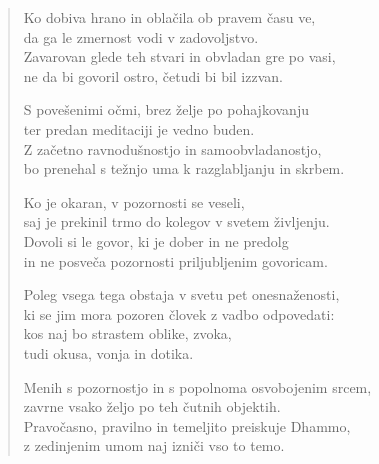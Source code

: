 \begin{verse}
Ko dobiva hrano in oblačila ob pravem času ve,\\
da ga le zmernost vodi v zadovoljstvo.\\
Zavarovan glede teh stvari in obvladan gre po vasi,\\
ne da bi govoril ostro, četudi bi bil izzvan.

S povešenimi očmi, brez želje po pohajkovanju\\
ter predan meditaciji je vedno buden.\\
Z začetno ravnodušnostjo in samoobvladanostjo,\\
bo prenehal s težnjo uma k razglabljanju in skrbem.

Ko je okaran, v pozornosti se veseli,\\
saj je prekinil trmo do kolegov v svetem življenju.\\
Dovoli si le govor, ki je dober in ne predolg\\
in ne posveča pozornosti priljubljenim govoricam.

Poleg vsega tega obstaja v svetu pet onesnaženosti,\\
ki se jim mora pozoren človek z vadbo odpovedati:\\
kos naj bo strastem oblike, zvoka,\\
tudi okusa, vonja in dotika.

Menih s pozornostjo in s popolnoma osvobojenim srcem,\\
zavrne vsako željo po teh čutnih objektih.\\
Pravočasno, pravilno in temeljito preiskuje Dhammo,\\
z zedinjenim umom naj izniči vso to temo.

\end{verse}


\clearpage
\begin{verse}


\end{verse}


\clearpage
\begin{verse}


\end{verse}

